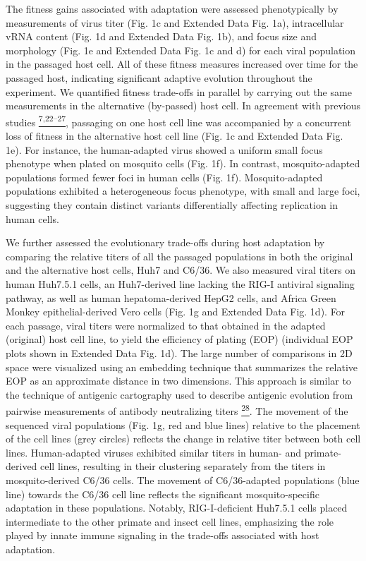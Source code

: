 \documentclass[
]{article}
\begin{document}
The fitness gains associated with adaptation were assessed
phenotypically by measurements of virus titer (Fig. 1c and Extended Data
Fig. 1a), intracellular vRNA content (Fig. 1d and Extended Data Fig.
1b), and focus size and morphology (Fig. 1e and Extended Data Fig. 1c
and d) for each viral population in the passaged host cell. All of these
fitness measures increased over time for the passaged host, indicating
significant adaptive evolution throughout the experiment. We quantified
fitness trade-offs in parallel by carrying out the same measurements in
the alternative (by-passed) host cell. In agreement with previous
studies
\href{https://paperpile.com/c/REZjPf/Bai6p+a4AV4+knFQ3+Mq62m+4eMRo+r0H6+YjlCW}{\textsuperscript{7,22--27}},
passaging on one host cell line was accompanied by a concurrent loss of
fitness in the alternative host cell line (Fig. 1c and Extended Data
Fig. 1e). For instance, the human-adapted virus showed a uniform small
focus phenotype when plated on mosquito cells (Fig. 1f). In contrast,
mosquito-adapted populations formed fewer foci in human cells (Fig. 1f).
Mosquito-adapted populations exhibited a heterogeneous focus phenotype,
with small and large foci, suggesting they contain distinct variants
differentially affecting replication in human cells.

We further assessed the evolutionary trade-offs during host adaptation
by comparing the relative titers of all the passaged populations in both
the original and the alternative host cells, Huh7 and C6/36. We also
measured viral titers on human Huh7.5.1 cells, an Huh7-derived line
lacking the RIG-I antiviral signaling pathway, as well as human
hepatoma-derived HepG2 cells, and Africa Green Monkey epithelial-derived
Vero cells (Fig. 1g and Extended Data Fig. 1d). For each passage, viral
titers were normalized to that obtained in the adapted (original) host
cell line, to yield the efficiency of plating (EOP) (individual EOP
plots shown in Extended Data Fig. 1d). The large number of comparisons
in 2D space were visualized using an embedding technique that summarizes
the relative EOP as an approximate distance in two dimensions. This
approach is similar to the technique of antigenic cartography used to
describe antigenic evolution from pairwise measurements of antibody
neutralizing titers
\href{https://paperpile.com/c/REZjPf/jN2vZ}{\textsuperscript{28}}. The
movement of the sequenced viral populations (Fig. 1g, red and blue
lines) relative to the placement of the cell lines (grey circles)
reflects the change in relative titer between both cell lines.
Human-adapted viruses exhibited similar titers in human- and
primate-derived cell lines, resulting in their clustering separately
from the titers in mosquito-derived C6/36 cells. The movement of
C6/36-adapted populations (blue line) towards the C6/36 cell line
reflects the significant mosquito-specific adaptation in these
populations. Notably, RIG-I-deficient Huh7.5.1 cells placed intermediate
to the other primate and insect cell lines, emphasizing the role played
by innate immune signaling in the trade-offs associated with host
adaptation.
\end{document}
